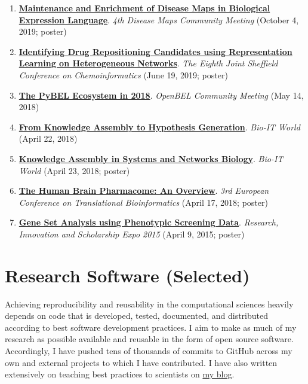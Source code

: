 \documentclass[10pt,a4paper,sans]{moderncv} %
\begin{document}
\begin{enumerate}
    \item \textbf{\href{https://doi.org/10.6084/m9.figshare.9917753.v3}{Maintenance and Enrichment of Disease Maps in Biological Expression Language}}. \textit{4th Disease Maps Community Meeting} (October 4, 2019; poster)

    \item \textbf{\href{https://doi.org/10.6084/m9.figshare.8288822.v2}{Identifying Drug Repositioning Candidates using Representation Learning on Heterogeneous Networks}}. \textit{The Eighth Joint Sheffield Conference on Chemoinformatics} (June 19, 2019; poster)

    \item \textbf{\href{https://docs.google.com/presentation/d/1Gsk8LxrVgrICproSgWZ3Gk4BXyOg-UwFlfzhVw5O0t8/edit?usp=sharing}{The PyBEL Ecosystem in 2018}}. \textit{OpenBEL Community Meeting} (May 14, 2018)

    \item \textbf{\href{https://docs.google.com/presentation/d/1_3j8H4f9pQ1m2ZQrF2QNfQNLh5SGqaodnl4AlaAST6w/edit?usp=sharing}{From Knowledge Assembly to Hypothesis Generation}}. \textit{Bio-IT World} (April 22, 2018)

    \item \textbf{\href{https://doi.org/10.6084/m9.figshare.6231701.v1}{Knowledge Assembly in Systems and Networks Biology}}. \textit{Bio-IT World} (April 23, 2018; poster)

    \item \textbf{\href{https://doi.org/10.6084/m9.figshare.6163775.v3}{The Human Brain Pharmacome: An Overview}}. \textit{3rd European Conference on Translational Bioinformatics} (April 17, 2018; poster)

    \item \textbf{\href{https://docs.google.com/presentation/d/1FU8lWGw6x4y9A_qB9rmxSaRRKiC0V3403EJETVGYMzk/edit?usp=sharing}{Gene Set Analysis using Phenotypic Screening Data}}. \textit{Research, Innovation and Scholarship Expo 2015} (April 9, 2015; poster)

\end{enumerate}

\hfill \break

    \section{Research Software (Selected)}\label{sec:software}

    Achieving reproducibility and reusability in the computational
    sciences heavily depends on code that is developed,
    tested, documented, and distributed according to best software
    development practices. I aim to make as much of my research
    as possible available and reusable in the form of open source
    software. Accordingly, I have pushed tens of thousands of commits
    to GitHub across my own and external projects to which I have
    contributed. I have also written extensively on teaching best
    practices to scientists on \href{https://cthoyt.com/software/}{my blog}.
\end{document}
